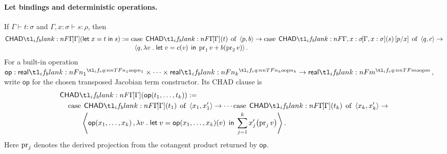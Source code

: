 \documentclass[11pt,a4paper]{article}
\theoremstyle{definition}
\theoremstyle{remark}
\providecommand{\srcop}{\mathsf{op}}
\providecommand{\tgtop}{\mathsf{op}}
\providecommand{\casubst}[3]{#1[#3/#2]}
\providecommand{\letst}[3]{\mathsf{let}\;#1=#2\;\mathsf{in}\;#3}
\begin{document}
\paragraph{Let bindings and deterministic operations.}
If \(\Gamma\vdash t:\sigma\) and \(\Gamma,x:\sigma\vdash s:\rho\), then
\begin{align}
  \label{eq:appendix-chad-let}
  \Fun[np]{\chad[\Gamma]}{\letst{x}{t}{s}}
  &:=
  \opn[b]{case}\;\Fun[np]{\chad[\Gamma]}{t}\;\opn[b]{of}\;\tuple{p,b}\to
  \opn[b]{case}\;\casubst{\Fun[np]{\chad[\Gamma,x:\sigma]}{s}}{x}{p}\;\opn[b]{of}\;\tuple{q,c}\to
  \notag\\[-2pt]
  &\qquad
  \tuple{
    q,
    \lambda v\; .\;
    \letst{v}{\fn[n]{c}{v}}{
      \opn[b]{pr}_{1}v + \fn[n]{b}{\opn[b]{pr}_{2}v}
    }
  }.
\end{align}
For a built-in operation
\(\srcop: \srcreal[n_{1}]\times\cdots\times\srcreal[n_{k}]\to\srcreal[m]\),
write \(\tgtop\) for the chosen transposed Jacobian term constructor.  Its CHAD
clause is
\begin{align}
  \label{eq:appendix-chad-op}
  &\Fun[np]{\chad[\Gamma]}{\fn[n]{\srcop}{t_{1},\dots,t_{k}}}
  :=
  \notag\\
  &\quad
  \opn[b]{case}\;\Fun[np]{\chad[\Gamma]}{t_{1}}\;\opn[b]{of}\;\tuple{x_{1},x_{1}'}\to
  \cdots
  \opn[b]{case}\;\Fun[np]{\chad[\Gamma]}{t_{k}}\;\opn[b]{of}\;\tuple{x_{k},x_{k}'}\to
  \notag\\[-2pt]
  &\quad\qquad
  \tuple{
    \fn[n]{\srcop}{x_{1},\dots,x_{k}},
    \lambda v\; .\;
    \letst{v}{\fn[n]{\fn[n]{\tgtop}{x_{1},\dots,x_{k}}}{v}}{
      \sum_{j=1}^{k}
      \fn[n]{x_{j}'}{\opn[b]{pr}_{j}v}
    }
  }.
\end{align}
Here \(\opn[b]{pr}_{j}\) denotes the derived projection from the cotangent product
returned by \(\tgtop\).
\end{document}

